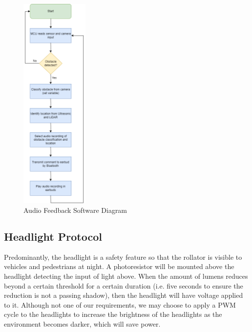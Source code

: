\begin{figure}[H]
	\centering
	\includegraphics[width=0.3\textwidth]{./Images/audio2.drawio.png}
	\caption{\label{fig:audiosw}Audio Feedback Software Diagram}
\end{figure}

\subsection{Headlight Protocol}
\noindent  Predominantly, the headlight is a safety feature so that the rollator is visible to vehicles and pedestrians at night. A photoresistor will be mounted above the headlight detecting the input of light above. When the amount of lumens reduces beyond a certain threshold for a certain duration (i.e. five seconds to ensure the reduction is not a passing shadow), then the headlight will have voltage applied to it. Although not one of our requirements, we may choose to apply a PWM cycle to the headlights to increase the brightness of the headlights as the environment becomes darker, which will save power.